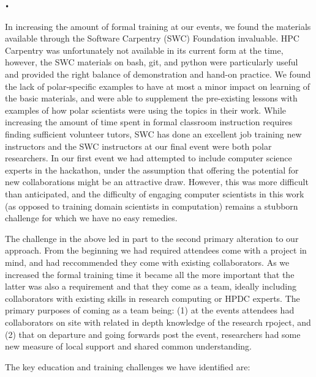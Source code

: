 \texttt{•}\documentclass[10pt,letterpaper,draft]{article}
\begin{document}
In increasing the amount of formal training at our events, we found the materials available through the Software Carpentry (SWC) Foundation invaluable. HPC Carpentry was unfortunately not available in its current form at the time, however, the SWC materials on bash, git, and python were particularly useful and provided the right balance of demonstration and hand-on practice. We found the lack of polar-specific examples to have at most a minor impact on learning of the basic materials, and were able to supplement the pre-existing lessons with examples of how polar scientists were using the topics in their work. While increasing the amount of time spent in formal classroom instruction requires finding sufficient volunteer tutors, SWC has done an excellent job training new instructors and the SWC instructors at our final event were both polar researchers.  In our first event we had attempted to include computer science experts in the hackathon, under the assumption that offering the potential for new collaborations might be an attractive draw. However, this was more difficult than anticipated, and the difficulty of engaging computer scientists in this work (as opposed to training domain scientists in computation) remains a stubborn challenge for which we have no easy remedies.

The challenge in the above led in part to the second primary alteration to our approach.  From the beginning we had required attendees come with a project in mind, and had reccommended they come with existing collaborators.  As we increased the formal training time it became all the more important that the latter was also a requirement and that they come as a team, ideally including collaborators with existing skills in research computing or HPDC experts.  The primary purposes of coming as a team being: (1) at the events attendees had collaborators on site with related in depth knowledge of the research rpoject, and (2) that on departure and going forwards post the event, researchers had some new measure of local support and shared common understanding. 

The key education and training challenges we have identified are:
\end{document}
